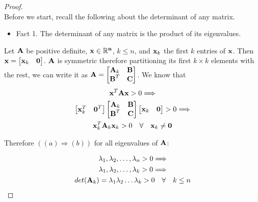 \documentclass[a4paper]{article}
\numberwithin{equation}{section} %
\newcommand{\setRn}{\mathbb{R}^n} %
\newcommand{\B}[1]{\textbf{\textup{#1}}} %
\begin{document}
\begin{proof}\quad \\
Before we start, recall the following about the determinant of any matrix.
\begin{itemize}
\item Fact 1. The determinant of any matrix is the product of its eigenvalues.
\end{itemize}

Let $\B{A}$ be positive definite, $\bf{x} \in \setRn$, $k \leq n$, and $\B{x}_{k}$ the first $k$ entries of $\B{x}$. Then $\B{x}=\begin{bmatrix}\B{x}_{k} & \B{0} \end{bmatrix}$. $\B{A}$ is symmetric therefore partitioning its first $k \times k$ elements with the rest, we can write it as $\B{A}=\begin{bmatrix}\B{A}_{k} & \B{B}\\\B{B}^{T} & \B{C}  \end{bmatrix}$. We know that
\[
\begin{gathered}
\B{x}^{T}\B{A}\B{x}>0 \Longrightarrow \\
\begin{bmatrix}\B{x}_{k}^{T} & \B{0}^{T} \end{bmatrix} \begin{bmatrix}\B{A}_{k} & \B{B}\\\B{B}^{T} & \B{C}  \end{bmatrix} \begin{bmatrix}\B{x}_{k} & \B{0} \end{bmatrix}>0 \Longrightarrow \\
\B{x}_{k}^{T}\B{A}_{k}\B{x}_{k}>0 \quad \forall \quad \B{x}_{k}\neq \B{0}
\end{gathered}
\]

Therefore $((a)\Rightarrow (b))$ for all eigenvalues of $\B{A}$:

\[
\begin{gathered}
\lambda_{1},\lambda_{2},\ldots , \lambda_{n}>0 \Longrightarrow \\
\lambda_{1},\lambda_{2},\ldots , \lambda_{k}>0 \Longrightarrow \\
det(\B{A}_{k})=\lambda_{1}\lambda_{2}\ldots \lambda_{k}>0 \quad \forall \quad k \leq n
\end{gathered}
\]

\end{proof}
\end{document}
